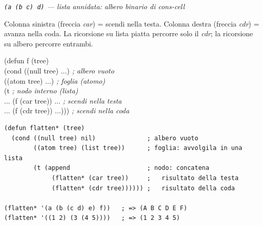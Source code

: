 \begin{center}
\smallskip
{\small\itshape\color{black!55}
\texttt{(a (b c) d)} --- lista annidata: albero binario di cons-cell}

\bigskip


\smallskip
{\small\color{black!55}
Colonna sinistra (freccia \emph{car}) = scendi nella testa.
Colonna destra (freccia \emph{cdr}) = avanza nella coda.
La ricorsione su lista piatta percorre solo il \emph{cdr};
la ricorsione su albero percorre entrambi.}

\end{center}
\vspace{6pt}

\begin{sintassi}
(defun f (tree)\\
\hspace{2em}(cond ((null tree) ...)         \textit{; albero vuoto}\\
\hspace{2em}\hspace{6em}((atom tree) ...)   \textit{; foglia (atomo)}\\
\hspace{2em}\hspace{6em}(t                  \textit{; nodo interno (lista)}\\
\hspace{4em}... (f (car tree)) ...          \textit{; scendi nella testa}\\
\hspace{4em}... (f (cdr tree)) ...)))       \textit{; scendi nella coda}
\end{sintassi}

\begin{esempio}
\begin{lstlisting}
(defun flatten* (tree)
  (cond ((null tree) nil)              ; albero vuoto
        ((atom tree) (list tree))      ; foglia: avvolgila in una lista
        (t (append                     ; nodo: concatena
             (flatten* (car tree))     ;   risultato della testa
             (flatten* (cdr tree)))))) ;   risultato della coda

(flatten* '(a (b (c d) e) f))   ; => (A B C D E F)
(flatten* '((1 2) (3 (4 5))))   ; => (1 2 3 4 5)
\end{lstlisting}
\end{esempio}

